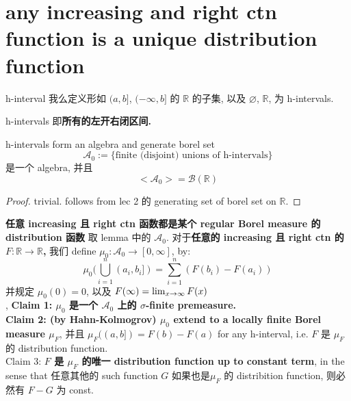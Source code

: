 \documentclass[lang=cn,11pt]{elegantbook}
\begin{document}
\section{any increasing and right ctn function is a unique distribution function}
\begin{definition}{h-interval}
    我么定义形如 $(a,b]$, $(-\infty, b]$ 的 $\mathbb{R}$  的子集, 以及 $\varnothing$, $\mathbb{R}$, 为 h-intervals.
\end{definition}
h-intervals 即\textbf{所有的左开右闭区间.}


\begin{lemma}{h-intervals form an algebra and generate borel set}
    $$
    \mathcal{A}_0 := \{  \text{finite (disjoint) unions of h-intervals}\}
    $$
是一个 algebra, 并且
$$
<\mathcal{A}_0> = \mathcal{B}(\mathbb{R})
$$
\end{lemma}
\begin{proof}
    trivial. follows from lec 2 的 generating set of borel set on $\mathbb{R}$.
\end{proof}




\begin{theorem}{\textbf{任意 increasing 且 right ctn 函数都是某个 regular Borel measure 的 distribution 函数}}
取 lemma 中的 $\mathcal{A}_0$.
对于\textbf{任意的 increasing 且 right ctn 的 $F: \mathbb{R} \to \mathbb{R}$,} 我们 define $\mu_0: \mathcal{A}_0 \to [0,\infty]$, by:
$$
\mu_0(\bigcup_{i=1}^n (a_i, b_i]) = \sum_{i=1}^n (F(b_i) - F(a_i))
$$ 并规定 $\mu_0(0) = 0$, 以及 $F(\infty) = \lim_{x\rightarrow \infty } F(x)$\\,
\textbf{Claim 1: $\mu_0$ 是一个 $\mathcal{A}_0$ 上的 $\sigma$-finite premeasure.}\\
\textbf{Claim 2: (by Hahn-Kolmogrov) $\mu_0$ extend to a locally finite Borel measure $\mu_F$}, 并且 $\mu_F ((a,b]) = F(b) - F(a)$ for any h-interval, i.e. $F$ 是 $\mu_F$ 的 distribution function.\\
Claim 3: \textbf{$F$ 是 $\mu_F$ 的唯一 distribution function up to constant term}, in the sense that 任意其他的 such function $G$ 如果也是$\mu_F$ 的 distribition function, 则必然有 $F-G$ 为 const. 
\end{theorem}
\end{document}
